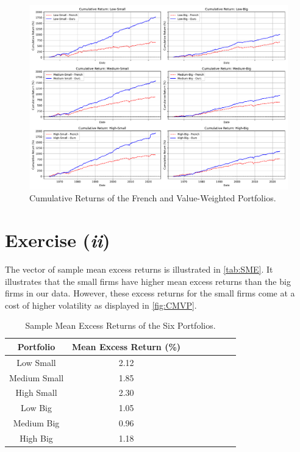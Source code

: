 \documentclass[a4paper,10pt,american]{article}
\begin{document}
\begin{figure}[H]
\centering
\includegraphics[width=1\linewidth]{../Plots/cumulative_returns.pdf}
\caption{Cumulative Returns of the French and Value-Weighted Portfolios.}
\label{fig:CRFVP}
\end{figure}

\section*{Exercise (\textit{ii})}

The vector of sample mean excess returns is illustrated in \autoref{tab:SME}.
It illustrates that the small firms have higher mean excess returns than the
big firms in our data. However, these excess returns for the small firms
come at a cost of higher volatility as displayed in \autoref{fig:CMVP}.

\begin{table}[H]
\centering
\caption{Sample Mean Excess Returns of the Six Portfolios.}
\label{tab:SME}  
\begin{tabular}{ c c c c c c c c }
\toprule
Portfolio & Mean Excess Return (\%) \\
\midrule
Low Small & 2.12 \\
Medium Small & 1.85 \\
High Small & 2.30 \\
Low Big & 1.05 \\
Medium Big & 0.96 \\
High Big & 1.18 \\
\bottomrule
\end{tabular}    
\end{table}
\end{document}
